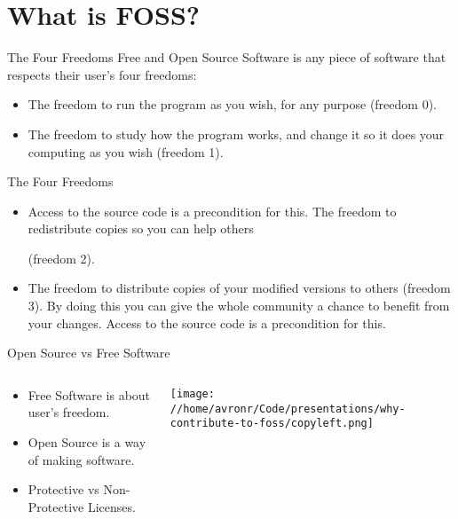 \documentclass[presentation]{beamer}
\begin{document}
\section*{What is FOSS?}
\label{sec:org7cc2bbe}
\begin{frame}[label={sec:orgba818ad}]{The Four Freedoms}
Free and Open Source Software is any piece of software that respects their
user's four freedoms:
\begin{itemize}
\item The freedom to run the program as you wish, for any purpose (freedom 0).
\item The freedom to study how the program works, and change it so it does your
computing as you wish (freedom 1).
\end{itemize}
\end{frame}
\begin{frame}[label={sec:org58a0ae1}]{The Four Freedoms}
\begin{itemize}
\item Access to the source code is a precondition for this. The freedom to
redistribute copies so you can help others

(freedom 2).
\item The freedom to distribute copies of your modified versions to others
(freedom 3). By doing this you can give the whole community a chance to
benefit from your changes. Access to the source code is a precondition for
this.
\end{itemize}
\end{frame}
\begin{frame}[label={sec:org192e9e7}]{Open Source vs Free Software}
\begin{columns}
\begin{column}{0.6\columnwidth}
\begin{itemize}
\item Free Software is about user's freedom.
\item Open Source is a way of making software.
\item Protective vs Non-Protective Licenses.
\end{itemize}
\end{column}
\begin{column}{0.4\columnwidth}
\begin{center}
\texttt{[image: //home/avronr/Code/presentations/why-contribute-to-foss/copyleft.png]}
\end{center}
\end{column}
\end{columns}
\end{frame}
\end{document}
